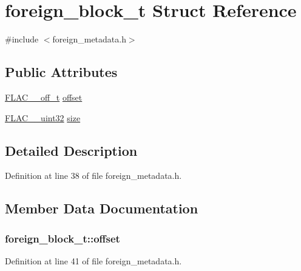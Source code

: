 \hypertarget{structforeign__block__t}{}\section{foreign\+\_\+block\+\_\+t Struct Reference}
\label{structforeign__block__t}


{\ttfamily \#include $<$foreign\+\_\+metadata.\+h$>$}

\subsection*{Public Attributes}
\begin{DoxyCompactItemize}
\item 
\hyperlink{libflac_2include_2share_2compat_8h_a125fb0105eee035da35c6a4999d140eb}{F\+L\+A\+C\+\_\+\+\_\+off\+\_\+t} \hyperlink{structforeign__block__t_aa63608223c494402e8b4e08f13aee83f}{offset}
\item 
\hyperlink{ordinals_8h_a9c4005ea7ef8d564b0cc993cdd0e4e5e}{F\+L\+A\+C\+\_\+\+\_\+uint32} \hyperlink{structforeign__block__t_a6aba5c004554c4f1a0a273ac202f071d}{size}
\end{DoxyCompactItemize}


\subsection{Detailed Description}


Definition at line 38 of file foreign\+\_\+metadata.\+h.



\subsection{Member Data Documentation}
\subsubsection[{\texorpdfstring{offset}{offset}}]{ foreign\+\_\+block\+\_\+t\+::offset}\hypertarget{structforeign__block__t_aa63608223c494402e8b4e08f13aee83f}{}\label{structforeign__block__t_aa63608223c494402e8b4e08f13aee83f}


Definition at line 41 of file foreign\+\_\+metadata.\+h.

